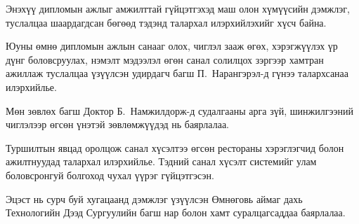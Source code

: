 \vspace{0.8cm}
{\normalsize
Энэхүү дипломын ажлыг амжилттай гүйцэтгэхэд маш олон хүмүүсийн дэмжлэг,
туслалцаа шаардагдсан бөгөөд тэдэнд талархал илэрхийлэхийг хүсч байна.

Юуны өмнө дипломын ажлын санааг олох, чиглэл зааж өгөх, хэрэгжүүлэх үр дүнг
боловсруулах, нэмэлт мэдээлэл өгөн санал солилцох зэргээр хамтран ажиллаж
туслалцаа үзүүлсэн удирдагч багш П.~Нарангэрэл-д гүнээ талархсанаа илэрхийлье.

Мөн зөвлөх багш Доктор Б.~Намжилдорж-д судалгааны арга зүй, шинжилгээний чиглэлээр
өгсөн үнэтэй зөвлөмжүүдэд нь баярлалаа.

Туршилтын явцад оролцож санал хүсэлтээ өгсөн рестораны хэрэглэгчид болон ажилтнуудад
талархал илэрхийлье. Тэдний санал хүсэлт системийг улам боловсронгуй болгоход чухал
үүрэг гүйцэтгэсэн.

Эцэст нь сурч буй хугацаанд дэмжлэг үзүүлсэн Өмнөговь аймаг дахь Технологийн Дээд
Сургуулийн багш нар болон хамт суралцагсаддаа баярлалаа.
}
\clearpage
